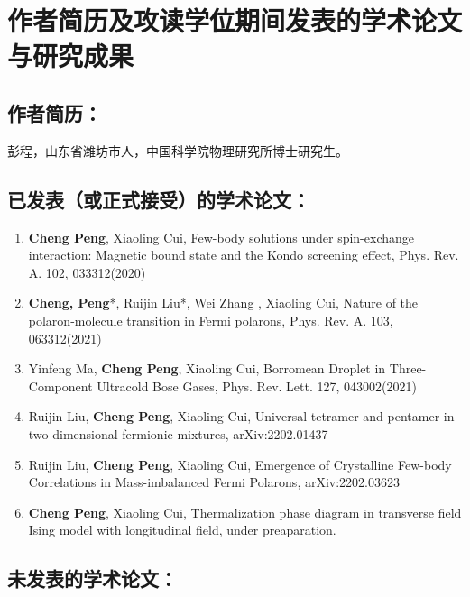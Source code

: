 \chapter{作者简历及攻读学位期间发表的学术论文与研究成果}


\section*{作者简历：}

彭程，山东省潍坊市人，中国科学院物理研究所博士研究生。

\section*{已发表（或正式接受）的学术论文：}

{
\setlist[enumerate]{}%

\begin{enumerate}[nosep]
    \item {\bfseries\sffamily Cheng Peng}, Xiaoling Cui, Few-body solutions under spin-exchange interaction: Magnetic bound state and the Kondo screening effect, Phys. Rev. A. 102, 033312(2020)
    
    \item {\bfseries\sffamily Cheng, Peng}*, Ruijin Liu*, Wei Zhang , Xiaoling Cui, Nature of the polaron-molecule transition in Fermi polarons, Phys. Rev. A. 103, 063312(2021)

    \item Yinfeng Ma, {\bfseries\sffamily Cheng Peng}, Xiaoling Cui, Borromean Droplet in Three-Component Ultracold Bose Gases, Phys. Rev. Lett. 127, 043002(2021)

    \item Ruijin Liu, {\bfseries\sffamily Cheng Peng}, Xiaoling Cui, Universal tetramer and pentamer in two-dimensional fermionic mixtures, arXiv:2202.01437

    \item Ruijin Liu, {\bfseries\sffamily Cheng Peng}, Xiaoling Cui, Emergence of Crystalline Few-body Correlations in Mass-imbalanced Fermi Polarons, arXiv:2202.03623

    \item {\bfseries\sffamily Cheng Peng}, Xiaoling Cui, Thermalization phase diagram in transverse field Ising  model with longitudinal field, under preaparation.
\end{enumerate}
}


\section*{未发表的学术论文：}

